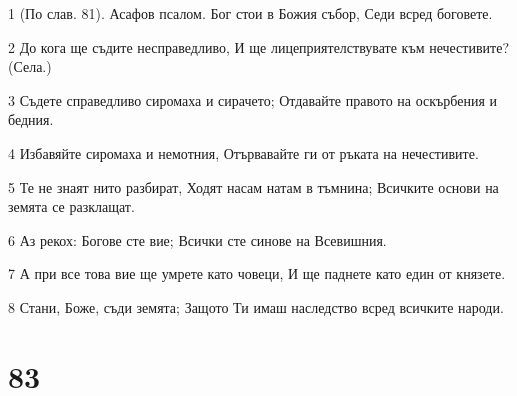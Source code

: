 \par 1 (По слав. 81). Асафов псалом. Бог стои в Божия събор, Седи всред боговете.
\par 2 До кога ще съдите несправедливо, И ще лицеприятелствувате към нечестивите? (Села.)
\par 3 Съдете справедливо сиромаха и сирачето; Отдавайте правото на оскърбения и бедния.
\par 4 Избавяйте сиромаха и немотния, Отървавайте ги от ръката на нечестивите.
\par 5 Те не знаят нито разбират, Ходят насам натам в тъмнина; Всичките основи на земята се разклащат.
\par 6 Аз рекох: Богове сте вие; Всички сте синове на Всевишния.
\par 7 А при все това вие ще умрете като човеци, И ще паднете като един от князете.
\par 8 Стани, Боже, съди земята; Защото Ти имаш наследство всред всичките народи.

\chapter{83}

